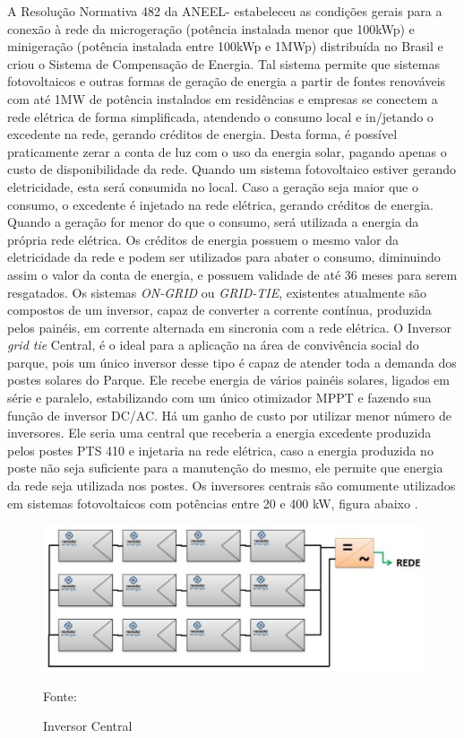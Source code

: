 	A Resolu\c{c}\~ao Normativa 482 da ANEEL- estabeleceu as condi\c{c}\~oes gerais para a conex\~ao \`a rede da microgera\c{c}\~ao (pot\^encia instalada menor que 100kWp) e minigera\c{c}\~ao (pot\^encia instalada entre 100kWp e 1MWp) distribu\'ida no Brasil e criou o Sistema de Compensa\c{c}\~ao de Energia. Tal sistema permite que sistemas fotovoltaicos  e outras formas de gera\c{c}\~ao de energia a partir de fontes renov\'aveis com at\'e 1MW de pot\^encia  instalados em resid\^encias e empresas  se conectem a rede el\'etrica de forma simplificada, atendendo o consumo local e in/jetando o excedente na rede, gerando cr\'editos de energia\cite{SMARTLY}. 
	Desta forma, \'e poss\'ivel praticamente zerar a conta de luz com o uso da energia solar, pagando apenas o custo de disponibilidade da rede. Quando um sistema fotovoltaico estiver gerando eletricidade, esta ser\'a consumida no local. Caso a gera\c{c}\~ao seja maior que o consumo, o excedente \'e injetado na rede el\'etrica, gerando cr\'editos de energia. Quando a gera\c{c}\~ao for menor do que o consumo, ser\'a utilizada a energia da pr\'opria rede el\'etrica. Os cr\'editos de energia possuem o mesmo valor da eletricidade da rede e podem ser utilizados para abater o consumo, diminuindo assim o valor da conta de energia, e possuem validade de at\'e 36 meses para serem resgatados.
	Os sistemas \textit{ON-GRID} ou \textit{GRID-TIE}, existentes atualmente s\~ao compostos de um inversor, capaz de converter a corrente cont\'inua, produzida pelos pain\'eis, em corrente alternada em sincronia com a rede el\'etrica.
	O Inversor \textit{grid tie} Central, \'e o ideal para a aplica\c{c}\~ao na \'area de conviv\^encia social do parque, pois um \'unico inversor desse tipo \'e capaz de atender toda a demanda dos postes solares do Parque. Ele recebe energia de v\'arios pain\'eis solares, ligados em s\'erie e paralelo, estabilizando com um \'unico otimizador MPPT e fazendo sua fun\c{c}\~ao de inversor DC/AC. H\'a um ganho de custo por utilizar menor n\'umero de inversores. Ele seria uma central que receberia a energia excedente produzida pelos postes PTS 410 e injetaria na rede el\'etrica, caso a energia produzida no poste n\~ao seja suficiente para a manuten\c{c}\~ao do mesmo, ele permite que energia da rede seja utilizada nos postes. Os inversores centrais s\~ao comumente utilizados em sistemas fotovoltaicos com pot\^encias entre 20 e 400 kW, figura abaixo \cite{SUNLABPTS}.
	
\begin{figure}[H]
	\centering
	\label{InversorCentral}
		\includegraphics[keepaspectratio=true,scale=0.9]{figuras/InversorCentral.png}
	\caption{Inversor Central}
	\small{Fonte: \cite{NEOSOLAR} }
\end{figure}
	
